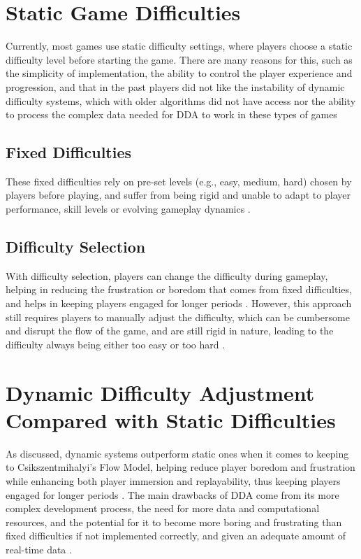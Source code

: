 \begin{spacing}{2.0}
	\section{Static Game Difficulties}

	Currently, most games use static difficulty settings, where players choose a static difficulty level before starting the game.
	There are many reasons for this, such as the simplicity of implementation, the ability to control the player experience
	and progression, and that in the past players did not like the instability of dynamic difficulty systems, which with older algorithms
	did not have access nor the ability to process the complex data needed for DDA to work in these types of games \cite{attard_analysing_2021}

	\subsection{Fixed Difficulties}

	These fixed difficulties rely on pre-set levels (e.g., easy, medium, hard) chosen by players before playing, and suffer from
	being rigid and unable to adapt to player performance, skill levels or evolving gameplay dynamics \cite{attard_analysing_2021} \cite{laus_dynamic_2022}.

	\subsection{Difficulty Selection}

	With difficulty selection, players can change the difficulty during gameplay, helping in reducing the frustration or boredom that
	comes from fixed difficulties, and helps in keeping players engaged for longer periods \cite{attard_analysing_2021} \cite{laus_dynamic_2022}. However, this approach still requires players to manually adjust the difficulty,
	which can be cumbersome and disrupt the flow of the game, and are still rigid in nature, leading to the difficulty always being either too easy or too hard \cite{attard_analysing_2021} \cite{laus_dynamic_2022}.

	\section{Dynamic Difficulty Adjustment Compared with Static Difficulties}

	As discussed, dynamic systems outperform static ones when it comes to keeping to Csikszentmihalyi's Flow Model, helping reduce player boredom and frustration while enhancing both player immersion and replayability,
	thus keeping players engaged for longer periods \cite{grech_creating_2023} \cite{attard_analysing_2021} \cite{mifsud_utilizing_2021}. The main drawbacks of DDA come from its more complex development process, the need for more data and computational resources, and the potential for it to
	become more boring and frustrating than fixed difficulties if not implemented correctly, and given an adequate amount of real-time data \cite{attard_analysing_2021} \cite{laus_dynamic_2022}.


\end{spacing}
